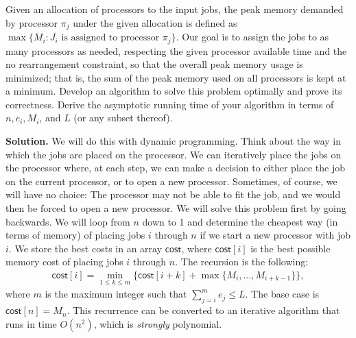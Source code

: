 \documentclass[11pt]{article}
\begin{document}
\begin{enumerate}
Given an allocation of processors to the input jobs, the peak memory demanded by processor $\pi_{j}$ under the given allocation is defined as $\max\{M_i: J_{i} \text{ is assigned to processor } \pi_{j}\}$. Our goal is to assign the jobs to as many processors as needed, respecting the given processor available time and the no rearrangement constraint, so that the overall peak memory usage is minimized; that is, the sum of the peak memory used on all processors is kept at a minimum. Develop an algorithm to solve this problem optimally and prove its correctness. Derive the asymptotic running time of your algorithm in terms of $n, e_i, M_i$, and $L$ (or any subset thereof).  

\textbf{Solution.} We will do this with dynamic programming. Think about the way in which the jobs are placed on the processor. We can iteratively place the jobs on the processor where, at each step, we can make a decision to either place the job on the current processor, or to open a new processor. Sometimes, of course, we will have no choice: The processor may not be able to fit the job, and we would then be forced to open a new processor.
We will solve this problem first by going backwards. We will loop from $n$ down to 1 and determine the cheapest way (in terms of memory) of placing jobs $i$ through $n$ if we start a new processor with job $i$. We store the best costs in an array $\textsf{cost}$, where $\textsf{cost}[i]$ is the best possible memory cost of placing jobs $i$ through $n$. The recursion is the following:
\begin{align*}
  \textsf{cost}[i] = \min_{1 \leqslant k \leqslant m}\bigl \{ \textsf{cost}[i+k] + \max\{M_{i}, \dotsc, M_{i+k-1}\} \bigr\},
\end{align*}
where $m$ is the maximum integer such that $\sum_{j=i}^{m}e_{j} \leqslant L$. The base case is $\textsf{cost}[n]=M_{n}$. This recurrence can be converted to an iterative algorithm that runs in time $O(n^{2})$, which is \emph{strongly} polynomial.


    
    


\end{enumerate}
\end{document}
